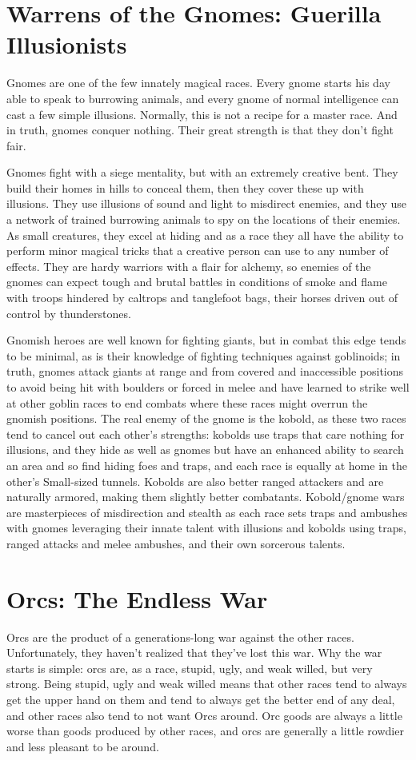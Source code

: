 \section{Warrens of the Gnomes: Guerilla Illusionists}
Gnomes are one of the few innately magical races. Every gnome starts his day able to speak to burrowing animals, and every gnome of normal intelligence can cast a few simple illusions. Normally, this is not a recipe for a master race. And in truth, gnomes conquer nothing. Their great strength is that they don't fight fair.

Gnomes fight with a siege mentality, but with an extremely creative bent. They build their homes in hills to conceal them, then they cover these up with illusions. They use illusions of sound and light to misdirect enemies, and they use a network of trained burrowing animals to spy on the locations of their enemies. As small creatures, they excel at hiding and as a race they all have the ability to perform minor magical tricks that a creative person can use to any number of effects. They are hardy warriors with a flair for alchemy, so enemies of the gnomes can expect tough and brutal battles in conditions of smoke and flame with troops hindered by caltrops and tanglefoot bags, their horses driven out of control by thunderstones.

Gnomish heroes are well known for fighting giants, but in combat this edge tends to be minimal, as is their knowledge of fighting techniques against goblinoids; in truth, gnomes attack giants at range and from covered and inaccessible positions to avoid being hit with boulders or forced in melee and have learned to strike well at other goblin races to end combats where these races might overrun the gnomish positions. The real enemy of the gnome is the kobold, as these two races tend to cancel out each other's strengths: kobolds use traps that care nothing for illusions, and they hide as well as gnomes but have an enhanced ability to search an area and so find hiding foes and traps, and each race is equally at home in the other's Small-sized tunnels. Kobolds are also better ranged attackers and are naturally armored, making them slightly better combatants. Kobold/gnome wars are masterpieces of misdirection and stealth as each race sets traps and ambushes with gnomes leveraging their innate talent with illusions and kobolds using traps, ranged attacks and melee ambushes, and their own sorcerous talents.

\section{Orcs: The Endless War}
Orcs are the product of a generations-long war against the other races. Unfortunately, they haven't realized that they've lost this war. Why the war starts is simple: orcs are, as a race, stupid, ugly, and weak willed, but very strong. Being stupid, ugly and weak willed means that other races tend to always get the upper hand on them and tend to always get the better end of any deal, and other races also tend to not want Orcs around. Orc goods are always a little worse than goods produced by other races, and orcs are generally a little rowdier and less pleasant to be around.

